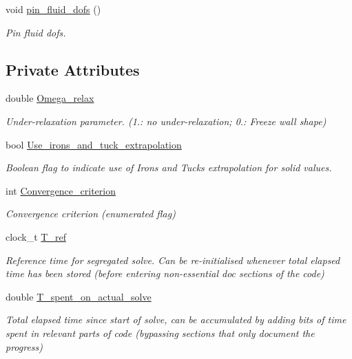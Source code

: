 \begin{DoxyCompactItemize}
void \hyperlink{classoomph_1_1SegregatableFSIProblem_a33397ef8c5410b782cc9801979812be0}{pin\+\_\+fluid\+\_\+dofs} ()
\begin{DoxyCompactList}\small\item\em Pin fluid dofs. \end{DoxyCompactList}\end{DoxyCompactItemize}
\subsection*{Private Attributes}
\begin{DoxyCompactItemize}
\item 
double \hyperlink{classoomph_1_1SegregatableFSIProblem_adc81fa8a44920be1b41dcea5008db7ed}{Omega\+\_\+relax}
\begin{DoxyCompactList}\small\item\em Under-\/relaxation parameter. (1.\+: no under-\/relaxation; 0.\+: Freeze wall shape) \end{DoxyCompactList}\item 
bool \hyperlink{classoomph_1_1SegregatableFSIProblem_a23930085f18e43926b6afcbbdd2a0509}{Use\+\_\+irons\+\_\+and\+\_\+tuck\+\_\+extrapolation}
\begin{DoxyCompactList}\small\item\em Boolean flag to indicate use of Irons and Tuck\textquotesingle{}s extrapolation for solid values. \end{DoxyCompactList}\item 
int \hyperlink{classoomph_1_1SegregatableFSIProblem_a971ddd09518a1771ae3a6ed85a51514e}{Convergence\+\_\+criterion}
\begin{DoxyCompactList}\small\item\em Convergence criterion (enumerated flag) \end{DoxyCompactList}\item 
clock\+\_\+t \hyperlink{classoomph_1_1SegregatableFSIProblem_a814254917e5cedc6fce1793168124beb}{T\+\_\+ref}
\begin{DoxyCompactList}\small\item\em Reference time for segregated solve. Can be re-\/initialised whenever total elapsed time has been stored (before entering non-\/essential doc sections of the code) \end{DoxyCompactList}\item 
double \hyperlink{classoomph_1_1SegregatableFSIProblem_a8043214c2864bd7584f40e684dcceb58}{T\+\_\+spent\+\_\+on\+\_\+actual\+\_\+solve}
\begin{DoxyCompactList}\small\item\em Total elapsed time since start of solve, can be accumulated by adding bits of time spent in relevant parts of code (bypassing sections that only document the progress) \end{DoxyCompactList}\item 

\end{DoxyCompactItemize}
